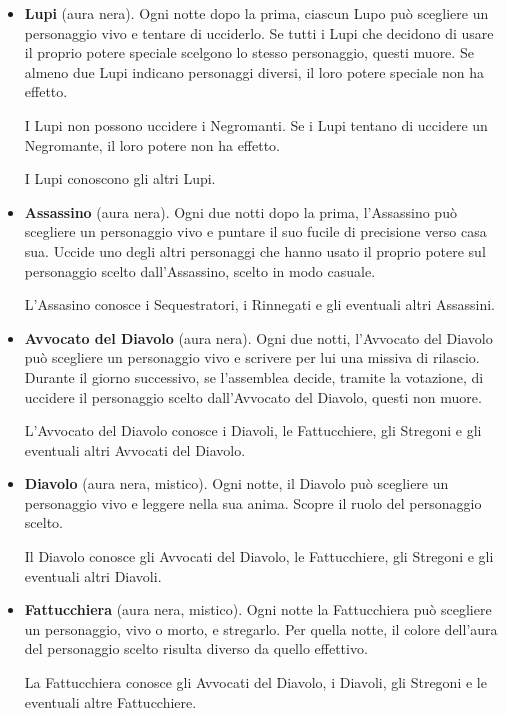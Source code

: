 \documentclass[a4paper,10pt]{article}
\begin{document}
\begin{itemize}
 \item {\bf Lupi} (aura nera). Ogni notte dopo la prima, ciascun Lupo può scegliere un personaggio vivo e tentare di ucciderlo. Se tutti i Lupi che decidono di usare il proprio potere speciale scelgono lo stesso personaggio, questi muore. Se almeno due Lupi indicano personaggi diversi, il loro potere speciale non ha effetto.
 
 I Lupi non possono uccidere i Negromanti. Se i Lupi tentano di uccidere un Negromante, il loro potere non ha effetto.
 
 I Lupi conoscono gli altri Lupi.
 
 \item {\bf Assassino} (aura nera). Ogni due notti dopo la prima, l'Assassino può scegliere un personaggio vivo e puntare il suo fucile di precisione verso casa sua. Uccide uno degli altri personaggi che hanno usato il proprio potere sul personaggio scelto dall'Assassino, scelto in modo casuale.
 
 L'Assasino conosce i Sequestratori, i Rinnegati e gli eventuali altri Assassini.

 \item {\bf Avvocato del Diavolo} (aura nera). Ogni due notti, l'Avvocato del Diavolo può scegliere un personaggio vivo e scrivere per lui una missiva di rilascio.
 Durante il giorno successivo, se l'assemblea decide, tramite la votazione, di uccidere il personaggio scelto dall'Avvocato del Diavolo, questi non muore.
 
 L'Avvocato del Diavolo conosce i Diavoli, le Fattucchiere, gli Stregoni e gli eventuali altri Avvocati del Diavolo.

 \item {\bf Diavolo} (aura nera, mistico). Ogni notte, il Diavolo può scegliere un personaggio vivo e leggere nella sua anima. Scopre il ruolo del personaggio scelto.
 
 Il Diavolo conosce gli Avvocati del Diavolo, le Fattucchiere, gli Stregoni e gli eventuali altri Diavoli.
 
 \item {\bf Fattucchiera} (aura nera, mistico). Ogni notte la Fattucchiera può scegliere un personaggio, vivo o morto, e stregarlo. Per quella notte, il colore dell'aura del personaggio scelto risulta diverso da quello effettivo.
 
 
 La Fattucchiera conosce gli Avvocati del Diavolo, i Diavoli, gli Stregoni e le eventuali altre Fattucchiere.
  

\end{itemize}
\end{document}
